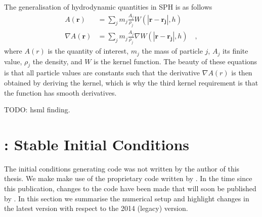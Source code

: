 \documentclass[MScProj_TLRH_ClusterEnergy.tex]{subfiles}
\begin{document}
The generalisation of hydrodynamic quantities in SPH is as follows
\begin{align}
    A(\mathbf{r}) &= \sum\limits_{j} m_j \frac{A_j}{\rho_j}
        W(|\mathbf{r}-\mathbf{r_j}|,h) \label{eq:sph} \\
    \nabla A(\mathbf{r}) &= \sum\limits_{j} m_j \frac{A_j}{\rho_j} 
        \nabla W(|\mathbf{r}-\mathbf{r_j}|,h)
        \label{eq:sphderivative} \quad ,
\end{align}
\noindent where $A(r)$ is the quantity of interest, $m_j$ the mass of particle
$j$, $A_j$ its finite value, $\rho_j$ the density, and $W$ is the kernel function.
The beauty of these equations is that all particle values are constants such that
the derivative $\nabla A(r)$ is then obtained by deriving the kernel, which is
why the third kernel requirement is that the function has smooth derivatives.

TODO: hsml finding.





\section{: Stable Initial Conditions}
\label{sec:methods-toycluster}
The initial conditions generating code was not written by the author of this
thesis. We make make use of the proprietary code  written by 
\citet{2014MNRAS.438.1971D}. In the time since this publication, changes to the
code have been made that will soon be published by \citet[in prep]{2016MNRAS.000.000D}.
In this section we summarise the numerical setup and highlight changes in the 
latest version with respect to the 2014 (legacy) version.
\end{document}
